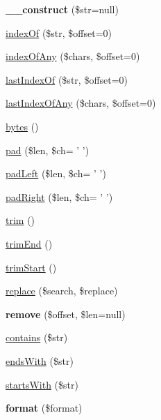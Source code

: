 \begin{DoxyCompactItemize}
\item 
\hypertarget{classString_a0b799cf9b80e4cff537c1f97782f96fd}{
{\bfseries \_\-\_\-construct} (\$str=null)}
\label{classString_a0b799cf9b80e4cff537c1f97782f96fd}

\item 
\hyperlink{classString_a5069041d10f95e4ec9a4be3cd17ab180}{indexOf} (\$str, \$offset=0)
\item 
\hyperlink{classString_a1c8a1df4030974f7ae48f59c1a9dca80}{indexOfAny} (\$chars, \$offset=0)
\item 
\hyperlink{classString_a18806fe790375032e3fb268f649914d7}{lastIndexOf} (\$str, \$offset=0)
\item 
\hyperlink{classString_adbe9cb0e51c46bd16881923a7a3d2e4a}{lastIndexOfAny} (\$chars, \$offset=0)
\item 
\hyperlink{classString_ae7254778c39de64320813d1da9f2f276}{bytes} ()
\item 
\hyperlink{classString_aa8542443a25479d810d0c580680f685d}{pad} (\$len, \$ch= ' ')
\item 
\hyperlink{classString_ae39386e13e0e87cff555bfaea20ce656}{padLeft} (\$len, \$ch= ' ')
\item 
\hyperlink{classString_a8ab0df0a7bbe4d99b84356403abf946f}{padRight} (\$len, \$ch= ' ')
\item 
\hyperlink{classString_ac3a075e35b0f39698230957bc7d0172d}{trim} ()
\item 
\hyperlink{classString_a316e68c5acc7716e4aac01c78a1b5063}{trimEnd} ()
\item 
\hyperlink{classString_a34b1f94648606639f31a7596445ff52e}{trimStart} ()
\item 
\hyperlink{classString_adc4f1d6a5b06b6c610f89131e7b8e403}{replace} (\$search, \$replace)
\item 
\hypertarget{classString_a0ebde07b97b307aedc7f1f17633b90b1}{
{\bfseries remove} (\$offset, \$len=null)}
\label{classString_a0ebde07b97b307aedc7f1f17633b90b1}

\item 
\hyperlink{classString_a459b87eb0e1fd06e68eb58b18ad11897}{contains} (\$str)
\item 
\hyperlink{classString_aa3256858bec84d6ec1d3b7184725f8bd}{endsWith} (\$str)
\item 
\hyperlink{classString_a0ab7fda4a4bc07fcc3ad0eb94cb96b22}{startsWith} (\$str)
\item 
\hypertarget{classString_a680db6e27d0ad3a50aaf779476402def}{
{\bfseries format} (\$format)}
\label{classString_a680db6e27d0ad3a50aaf779476402def}


\end{DoxyCompactItemize}
